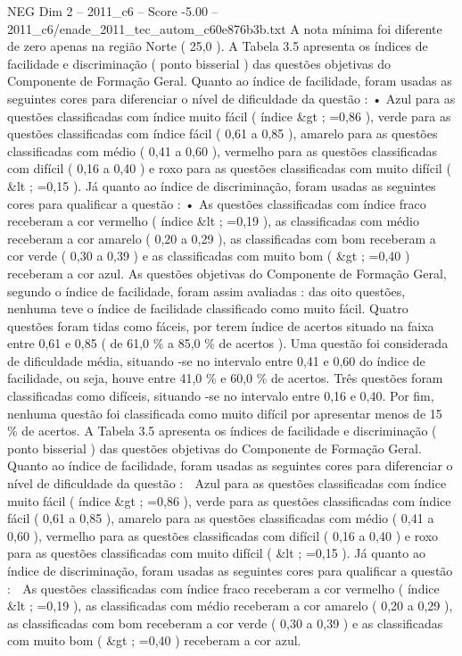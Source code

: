 \begin{textsample}{NEG Dim 2 – 2011\_c6 – Score -5.00 – 2011\_c6/enade\_2011\_tec\_autom\_c60e876b3b.txt}
A nota mínima foi diferente de zero apenas na região Norte ( 25,0 ).
A Tabela 3.5 apresenta os índices de facilidade e discriminação ( ponto bisserial ) das questões objetivas do Componente de Formação Geral.
Quanto ao índice de facilidade, foram usadas as seguintes cores para diferenciar o nível de dificuldade da questão : • Azul para as questões classificadas com índice muito fácil ( índice \&gt ; =0,86 ), verde para as questões classificadas com índice fácil ( 0,61 a 0,85 ), amarelo para as questões classificadas com médio ( 0,41 a 0,60 ), vermelho para as questões classificadas com difícil ( 0,16 a 0,40 ) e roxo para as questões classificadas com muito difícil ( \&lt ; =0,15 ).
Já quanto ao índice de discriminação, foram usadas as seguintes cores para qualificar a questão : • As questões classificadas com índice fraco receberam a cor vermelho ( índice \&lt ; =0,19 ), as classificadas com médio receberam a cor amarelo ( 0,20 a 0,29 ), as classificadas com bom receberam a cor verde ( 0,30 a 0,39 ) e as classificadas com muito bom ( \&gt ; =0,40 ) receberam a cor azul.
As questões objetivas do Componente de Formação Geral, segundo o índice de facilidade, foram assim avaliadas : das oito questões, nenhuma teve o índice de facilidade classificado como muito fácil.
Quatro questões foram tidas como fáceis, por terem índice de acertos situado na faixa entre 0,61 e 0,85 ( de 61,0 \% a 85,0 \% de acertos ).
Uma questão foi considerada de dificuldade média, situando -se no intervalo entre 0,41 e 0,60 do índice de facilidade, ou seja, houve entre 41,0 \% e 60,0 \% de acertos.
Três questões foram classificadas como difíceis, situando -se no intervalo entre 0,16 e 0,40.
Por fim, nenhuma questão foi classificada como muito difícil por apresentar menos de 15 \% de acertos.
A Tabela 3.5 apresenta os índices de facilidade e discriminação ( ponto bisserial ) das questões objetivas do Componente de Formação Geral.
Quanto ao índice de facilidade, foram usadas as seguintes cores para diferenciar o nível de dificuldade da questão :  Azul para as questões classificadas com índice muito fácil ( índice \&gt ; =0,86 ), verde para as questões classificadas com índice fácil ( 0,61 a 0,85 ), amarelo para as questões classificadas com médio ( 0,41 a 0,60 ), vermelho para as questões classificadas com difícil ( 0,16 a 0,40 ) e roxo para as questões classificadas com muito difícil ( \&lt ; =0,15 ).
Já quanto ao índice de discriminação, foram usadas as seguintes cores para qualificar a questão :  As questões classificadas com índice fraco receberam a cor vermelho ( índice \&lt ; =0,19 ), as classificadas com médio receberam a cor amarelo ( 0,20 a 0,29 ), as classificadas com bom receberam a cor verde ( 0,30 a 0,39 ) e as classificadas com muito bom ( \&gt ; =0,40 ) receberam a cor azul.

\end{textsample}
